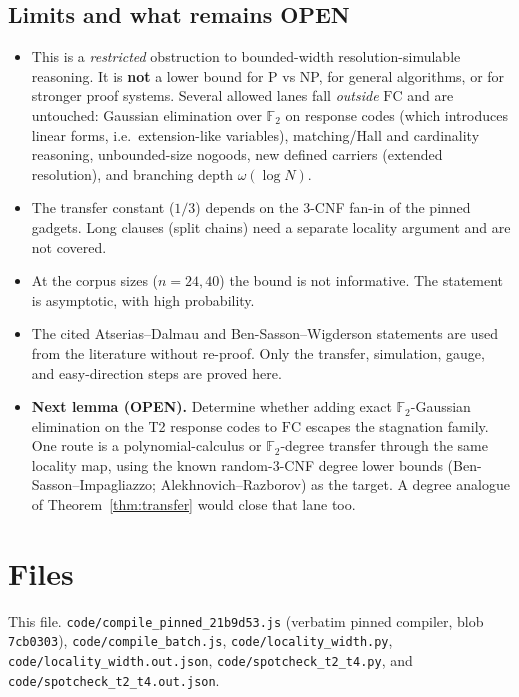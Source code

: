 \documentclass[11pt]{article}
\theoremstyle{definition}
\newcommand{\F}{\mathbb{F}_2}
\begin{document}
\subsection*{Limits and what remains OPEN}
\begin{itemize}
\item This is a \emph{restricted} obstruction to bounded-width resolution-simulable reasoning. It is \textbf{not} a lower bound for P vs NP, for general algorithms, or for stronger proof systems. Several allowed lanes fall \emph{outside} $\mathrm{FC}$ and are untouched: Gaussian elimination over $\F$ on response codes (which introduces linear forms, i.e.\ extension-like variables), matching/Hall and cardinality reasoning, unbounded-size nogoods, new defined carriers (extended resolution), and branching depth $\omega(\log N)$.
\item The transfer constant ($1/3$) depends on the 3-CNF fan-in of the pinned gadgets. Long clauses (split chains) need a separate locality argument and are not covered.
\item At the corpus sizes ($n=24,40$) the bound is not informative. The statement is asymptotic, with high probability.
\item The cited Atserias--Dalmau and Ben-Sasson--Wigderson statements are used from the literature without re-proof. Only the transfer, simulation, gauge, and easy-direction steps are proved here.
\item \textbf{Next lemma (OPEN).} Determine whether adding exact $\F$-Gaussian elimination on the T2 response codes to $\mathrm{FC}$ escapes the stagnation family. One route is a polynomial-calculus or $\F$-degree transfer through the same locality map, using the known random-3-CNF degree lower bounds (Ben-Sasson--Impagliazzo; Alekhnovich--Razborov) as the target. A degree analogue of Theorem~\ref{thm:transfer} would close that lane too.
\end{itemize}

\section*{Files}
This file. \texttt{code/compile\_pinned\_21b9d53.js} (verbatim pinned compiler, blob \texttt{7cb0303}), \texttt{code/compile\_batch.js}, \texttt{code/locality\_width.py}, \texttt{code/locality\_width.out.json}, \texttt{code/spotcheck\_t2\_t4.py}, and \texttt{code/spotcheck\_t2\_t4.out.json}.
\end{document}

